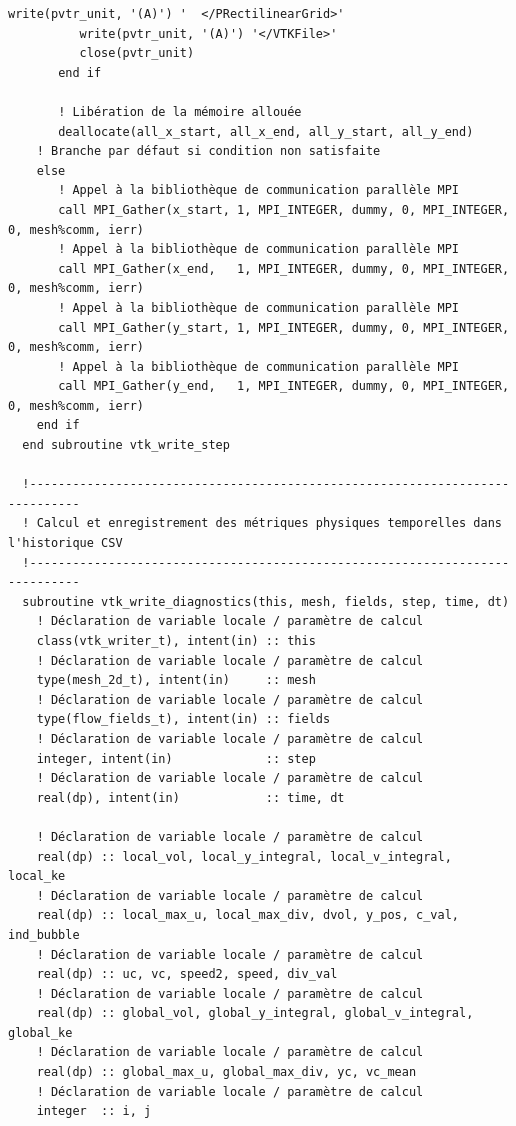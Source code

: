 \documentclass[10pt,a4paper,oneside]{book}
\begin{document}
\begin{lstlisting}[language={[95]Fortran}]
          write(pvtr_unit, '(A)') '  </PRectilinearGrid>'
          write(pvtr_unit, '(A)') '</VTKFile>'
          close(pvtr_unit)
       end if

       ! Libération de la mémoire allouée
       deallocate(all_x_start, all_x_end, all_y_start, all_y_end)
    ! Branche par défaut si condition non satisfaite
    else
       ! Appel à la bibliothèque de communication parallèle MPI
       call MPI_Gather(x_start, 1, MPI_INTEGER, dummy, 0, MPI_INTEGER, 0, mesh%comm, ierr)
       ! Appel à la bibliothèque de communication parallèle MPI
       call MPI_Gather(x_end,   1, MPI_INTEGER, dummy, 0, MPI_INTEGER, 0, mesh%comm, ierr)
       ! Appel à la bibliothèque de communication parallèle MPI
       call MPI_Gather(y_start, 1, MPI_INTEGER, dummy, 0, MPI_INTEGER, 0, mesh%comm, ierr)
       ! Appel à la bibliothèque de communication parallèle MPI
       call MPI_Gather(y_end,   1, MPI_INTEGER, dummy, 0, MPI_INTEGER, 0, mesh%comm, ierr)
    end if
  end subroutine vtk_write_step

  !-----------------------------------------------------------------------------
  ! Calcul et enregistrement des métriques physiques temporelles dans l'historique CSV
  !-----------------------------------------------------------------------------
  subroutine vtk_write_diagnostics(this, mesh, fields, step, time, dt)
    ! Déclaration de variable locale / paramètre de calcul
    class(vtk_writer_t), intent(in) :: this
    ! Déclaration de variable locale / paramètre de calcul
    type(mesh_2d_t), intent(in)     :: mesh
    ! Déclaration de variable locale / paramètre de calcul
    type(flow_fields_t), intent(in) :: fields
    ! Déclaration de variable locale / paramètre de calcul
    integer, intent(in)             :: step
    ! Déclaration de variable locale / paramètre de calcul
    real(dp), intent(in)            :: time, dt

    ! Déclaration de variable locale / paramètre de calcul
    real(dp) :: local_vol, local_y_integral, local_v_integral, local_ke
    ! Déclaration de variable locale / paramètre de calcul
    real(dp) :: local_max_u, local_max_div, dvol, y_pos, c_val, ind_bubble
    ! Déclaration de variable locale / paramètre de calcul
    real(dp) :: uc, vc, speed2, speed, div_val
    ! Déclaration de variable locale / paramètre de calcul
    real(dp) :: global_vol, global_y_integral, global_v_integral, global_ke
    ! Déclaration de variable locale / paramètre de calcul
    real(dp) :: global_max_u, global_max_div, yc, vc_mean
    ! Déclaration de variable locale / paramètre de calcul
    integer  :: i, j


\end{lstlisting}
\end{document}
